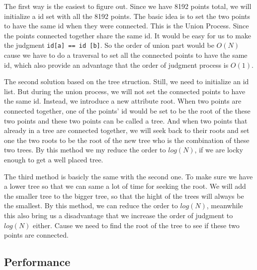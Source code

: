 \documentclass[conference]{IEEEtran}
\begin{document}
The first way is the easiest to figure out. Since we have 8192 points
total, we will initialize a id set with all the 8192 points. The basic
idea is to set the two points to have the same id when they were 
connected. This is the Union Process. Since the points connected 
together share the same id. It would be easy for us to make the 
judgment \verb|id[a] == id [b]|. So the order of union part would be $O(N)$ 
cause we have to do a traversal to set all the connected points to have
the same id, which also provide an advantage that the order of judgment
process is $O(1)$.

The second solution based on the tree struction. Still, we need to initialize an id
list. But during the union process, we will not set the connected points to have
the same id. Instead, we introduce a new attribute root. When two points are 
connected together, one of the points' id would be set to be the root of the these
two points and these two points can be called a tree. And when two points that 
already in a tree are connected together, we will seek back to their roots and 
set one the two roots to be the root of the new tree who is the combination of these
two trees. By this method we my reduce the order to $log(N)$, if we are locky enough
to get a well placed tree.

The third method is basicly the same with the second one. To make sure we have a 
lower tree so that we can same a lot of time for seeking the root. We will add the
smaller tree to the bigger tree, so that the hight of the trees will always be the 
smallest.
By this method, we can reduce the order to $log(N)$, meanwhile this
also bring us a disadvantage that we increase the order of judgment to $log(N)$ 
either. Cause we need to find the root of the tree to see if these two points are 
connected. 

\subsection*{Performance}
\end{document}
